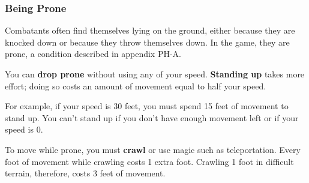 \documentclass[
]{article}
\begin{document}
\hypertarget{being-prone}{%
\subsubsection{Being Prone}\label{being-prone}}

Combatants often find themselves lying on the ground, either because
they are knocked down or because they throw themselves down. In the
game, they are prone, a condition described in appendix PH-A.

You can \textbf{drop prone} without using any of your speed.
\textbf{Standing up} takes more effort; doing so costs an amount of
movement equal to half your speed.

For example, if your speed is 30 feet, you must spend 15 feet of
movement to stand up. You can't stand up if you don't have enough
movement left or if your speed is 0.

To move while prone, you must \textbf{crawl} or use magic such as
teleportation. Every foot of movement while crawling costs 1 extra foot.
Crawling 1 foot in difficult terrain, therefore, costs 3 feet of
movement.
\end{document}
